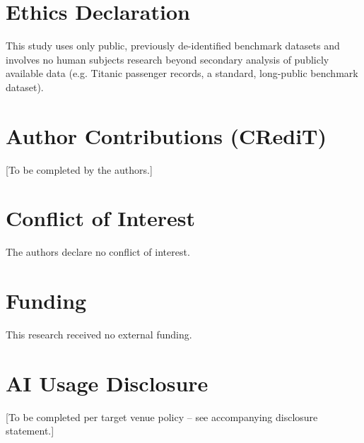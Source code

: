 \documentclass[11pt]{article}
\begin{document}
\section*{Ethics Declaration}
This study uses only public, previously de-identified benchmark datasets
and involves no human subjects research beyond secondary analysis of
publicly available data (e.g. Titanic passenger records, a standard,
long-public benchmark dataset).

\section*{Author Contributions (CRediT)}
[To be completed by the authors.]

\section*{Conflict of Interest}
The authors declare no conflict of interest.

\section*{Funding}
This research received no external funding.

\section*{AI Usage Disclosure}
[To be completed per target venue policy -- see accompanying disclosure
statement.]



\end{document}
